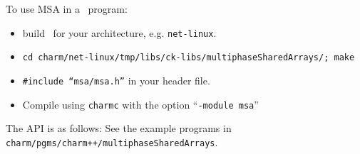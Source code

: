 To use MSA in a \charmpp\ program:
\begin{itemize}
\item build \charmpp\ for your architecture, e.g. \texttt{net-linux}.
\item \texttt{cd charm/net-linux/tmp/libs/ck-libs/multiphaseSharedArrays/; make}
\item \texttt{\#include ``msa/msa.h''} in your header file.
\item Compile using \texttt{charmc} with the option ``\texttt{-module
      msa}''
\end{itemize}

The API is as follows: See the example programs in
\texttt{charm/pgms/charm++/multiphaseSharedArrays}.
